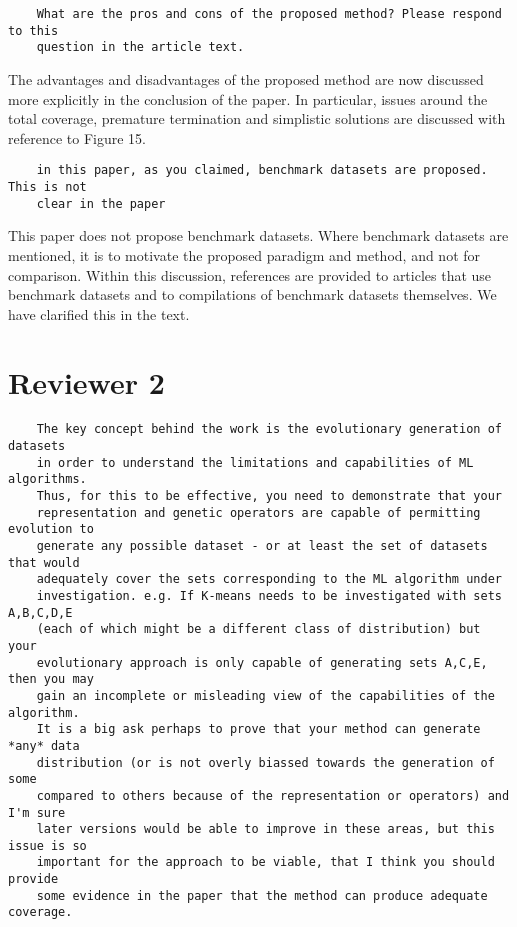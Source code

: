 \documentclass[11pt]{article}
\begin{document}
\begin{tcolorbox}
\begin{verbatim}
    What are the pros and cons of the proposed method? Please respond to this
    question in the article text.
\end{verbatim}
\end{tcolorbox}

The advantages and disadvantages of the proposed method are now discussed more
explicitly in the conclusion of the paper. In particular, issues around the
total coverage, premature termination and simplistic solutions are discussed
with reference to Figure 15.

\begin{tcolorbox}
\begin{verbatim}
    in this paper, as you claimed, benchmark datasets are proposed. This is not
    clear in the paper
\end{verbatim}
\end{tcolorbox}

This paper does not propose benchmark datasets. Where benchmark datasets are
mentioned, it is to motivate the proposed paradigm and method, and not for
comparison. Within this discussion, references are provided to articles that use
benchmark datasets and to compilations of benchmark datasets themselves. We have
clarified this in the text.


\section*{Reviewer 2}

\begin{tcolorbox}
\begin{verbatim}
    The key concept behind the work is the evolutionary generation of datasets
    in order to understand the limitations and capabilities of ML algorithms.
    Thus, for this to be effective, you need to demonstrate that your
    representation and genetic operators are capable of permitting evolution to
    generate any possible dataset - or at least the set of datasets that would
    adequately cover the sets corresponding to the ML algorithm under
    investigation. e.g. If K-means needs to be investigated with sets A,B,C,D,E
    (each of which might be a different class of distribution) but your
    evolutionary approach is only capable of generating sets A,C,E, then you may
    gain an incomplete or misleading view of the capabilities of the algorithm.
    It is a big ask perhaps to prove that your method can generate *any* data
    distribution (or is not overly biassed towards the generation of some
    compared to others because of the representation or operators) and I'm sure
    later versions would be able to improve in these areas, but this issue is so
    important for the approach to be viable, that I think you should provide
    some evidence in the paper that the method can produce adequate coverage.
\end{verbatim}
\end{tcolorbox}
\end{document}
